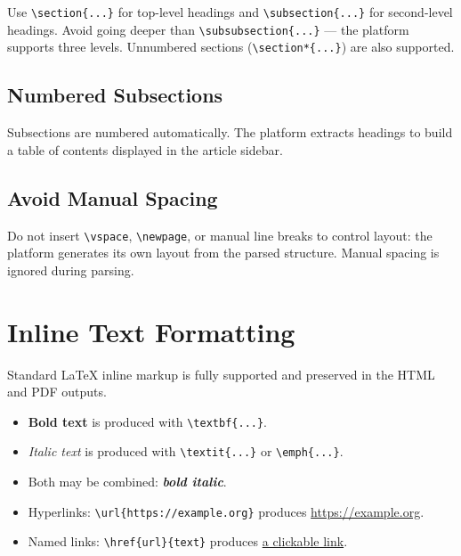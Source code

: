 Use \verb|\section{...}| for top-level headings and
\verb|\subsection{...}| for second-level headings. Avoid going deeper
than \verb|\subsubsection{...}| — the platform supports three levels.
Unnumbered sections (\verb|\section*{...}|) are also supported.

\subsection{Numbered Subsections}

Subsections are numbered automatically. The platform extracts headings to
build a table of contents displayed in the article sidebar.

\subsection{Avoid Manual Spacing}

Do not insert \verb|\vspace|, \verb|\newpage|, or manual line breaks to
control layout: the platform generates its own layout from the parsed
structure. Manual spacing is ignored during parsing.

\section{Inline Text Formatting}

Standard LaTeX inline markup is fully supported and preserved in the HTML
and PDF outputs.

\begin{itemize}
  \item \textbf{Bold text} is produced with \verb|\textbf{...}|.
  \item \textit{Italic text} is produced with \verb|\textit{...}| or \verb|\emph{...}|.
  \item Both may be combined: \textbf{\textit{bold italic}}.
  \item Hyperlinks: \verb|\url{https://example.org}| produces \url{https://example.org}.
  \item Named links: \verb|\href{url}{text}| produces \href{https://example.org}{a clickable link}.
\end{itemize}

